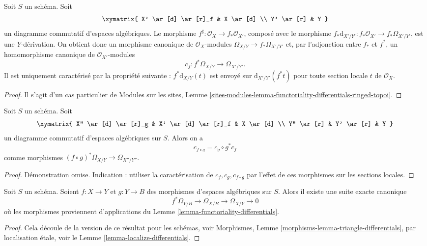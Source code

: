 \begin{lemma}
\label{lemma-functoriality-differentials}
Soit $S$ un schéma. Soit
$$
\xymatrix{
X' \ar[d] \ar[r]_f & X \ar[d] \\
Y' \ar[r] & Y
}
$$
un diagramme commutatif d'espaces algébriques. Le morphisme
$f^\sharp : \mathcal{O}_X \to f_*\mathcal{O}_{X'}$, composé avec le morphisme
$f_*\text{d}_{X'/Y'} : f_*\mathcal{O}_{X'} \to f_*\Omega_{X'/Y'}$, est une
$Y$-dérivation. On obtient donc un morphisme canonique de $\mathcal{O}_X$-modules
$\Omega_{X/Y} \to f_*\Omega_{X'/Y'}$ et, par
l'adjonction entre $f_*$ et $f^*$, un
homomorphisme canonique de $\mathcal{O}_{X'}$-modules
$$
c_f : f^*\Omega_{X/Y} \longrightarrow \Omega_{X'/Y'}.
$$
Il est uniquement caractérisé par la propriété suivante :
$f^*\text{d}_{X/Y}(t)$ est envoyé sur $\text{d}_{X'/Y'}(f^* t)$
pour toute section locale $t$ de $\mathcal{O}_X$.
\end{lemma}

\begin{proof}
Il s'agit d'un cas particulier de
Modules sur les sites, Lemme
\ref{sites-modules-lemma-functoriality-differentials-ringed-topoi}.
\end{proof}

\begin{lemma}
\label{lemma-check-functoriality-differentials}
Soit $S$ un schéma. Soit
$$
\xymatrix{
X'' \ar[d] \ar[r]_g & X' \ar[d] \ar[r]_f & X \ar[d] \\
Y'' \ar[r] & Y' \ar[r] & Y
}
$$
un diagramme commutatif d'espaces algébriques sur $S$. Alors on a
$$
c_{f \circ g} = c_g \circ g^* c_f
$$
comme morphismes $(f \circ g)^*\Omega_{X/Y} \to \Omega_{X''/Y''}$.
\end{lemma}

\begin{proof}
Démonstration omise. Indication : utiliser la caractérisation de $c_f, c_g, c_{f \circ g}$
par l'effet de ces morphismes sur les sections locales.
\end{proof}

\begin{lemma}
\label{lemma-triangle-differentials}
Soit $S$ un schéma.
Soient $f : X \to Y$ et $g : Y \to B$ des morphismes d'espaces algébriques sur $S$.
Alors il existe une suite exacte canonique
$$
f^*\Omega_{Y/B} \to \Omega_{X/B} \to \Omega_{X/Y} \to 0
$$
où les morphismes proviennent d'applications du
Lemme \ref{lemma-functoriality-differentials}.
\end{lemma}

\begin{proof}
Cela découle de la version de ce résultat pour les schémas, voir
Morphismes, Lemme \ref{morphisms-lemma-triangle-differentials},
par localisation étale, voir le
Lemme \ref{lemma-localize-differentials}.
\end{proof}

